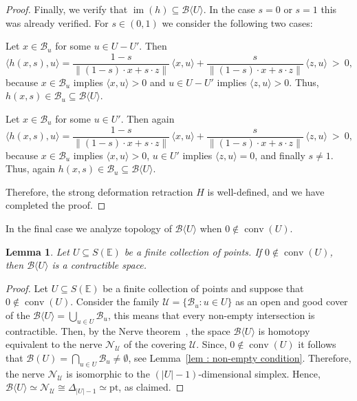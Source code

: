 \documentclass[a4paper,11pt,reqno, english]{amsart}
\newtheorem{lemma}[theorem]{Lemma}
\theoremstyle{definition}
\theoremstyle{remark}
\newcommand\U{\mathscr U}
\newcommand\E{\mathbb{E}}
\newcommand\pt{\mathrm{pt}}
\DeclareMathOperator{\im}{\mathrm{im}}
\DeclareMathOperator{\conv}{\mathrm{conv}}
\begin{document}
\begin{proof}
	\medskip
	Finally, we verify that $\im(h)\subseteq \mathscr{B}\langle U\rangle$.
	In the case $s=0$ or $s=1$ this was already verified.
	For $s\in (0,1)$ we consider the following two cases:
	\begin{compactenum}[\rm\qquad (a)]

		\item Let $x\in \mathscr{B}_u$ for some $u\in U-U'$. Then
		\[
			\langle h(x,s),u\rangle=
			\frac{1-s}{\| (1-s)\cdot x+s\cdot z\|}\,\langle x,u\rangle+
			\frac{s}{\| (1-s)\cdot x+s\cdot z\|}\,\langle z,u\rangle \ > \ 0,
		\]
		because $x\in \mathscr{B}_u$ implies $\langle x,u\rangle> 0$ and $u\in U-U'$ implies $\langle z,u\rangle> 0$.
		Thus, $h(x,s)\in \mathscr{B}_u\subseteq \mathscr{B}\langle U\rangle$.

		\item Let $x\in \mathscr{B}_u$ for some $u\in U'$. Then again
		\[
			\langle h(x,s),u\rangle=
			\frac{1-s}{\| (1-s)\cdot x+s\cdot z\|}\,\langle x,u\rangle+
			\frac{s}{\| (1-s)\cdot x+s\cdot z\|}\,\langle z,u\rangle \ > \ 0,
		\]
		because $x\in \mathscr{B}_u$ implies $\langle x,u\rangle> 0$, $u\in U'$ implies $\langle z,u\rangle= 0$, and finally $s\neq 1$.
		Thus, again $h(x,s)\in \mathscr{B}_u\subseteq \mathscr{B}\langle U\rangle$.
	\end{compactenum}


	\medskip
	Therefore, the strong deformation retraction $H$ is well-defined, and we have completed the proof.
\end{proof}

\medskip
In the final case we analyze topology of $\mathscr{B}\langle U\rangle$ when $0\notin  \conv (U)$.




\medskip
\begin{lemma}
	\label{lem :  case 03}
	Let $U\subseteq S(\E)$ be a finite collection of points.
	If $0\notin  \conv (U)$, then $\mathscr{B}\langle U\rangle$ is a contractible space.
\end{lemma}
\begin{proof}
	Let $U\subseteq S(\E)$ be a finite collection of points and suppose that $0\notin  \conv (U)$.
	Consider the family $\U=\{\mathscr{B}_u : u\in U\}$ as an open and good cover of the  $\mathscr{B}\langle U\rangle=\bigcup_{u\in U}\mathscr{B}_u$, this means that every non-empty intersection is contractible.
	Then, by the Nerve theorem~\cite[Cor.\,4G.3]{Hatcher2002}, the space  $\mathscr{B}\langle U\rangle$ is homotopy equivalent to the nerve $\mathcal{N}_{\U}$ of the covering $\U$.
	Since, $0\notin  \conv (U)$ it follows that $\mathscr{B}(U) =\bigcap_{u\in U}\mathscr{B}_u\neq\emptyset$, see Lemma~\ref{lem : non-empty condition}.
	Therefore, the nerve $\mathcal{N}_{\U}$ is isomorphic to the $(|U|-1)$-dimensional simplex.
	Hence, $\mathscr{B}\langle U\rangle\simeq \mathcal{N}_{\U} \cong \Delta_{|U|-1}\simeq\pt$, as claimed.


\end{proof}
\end{document}
